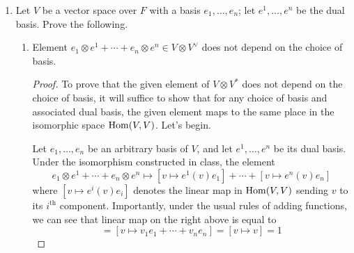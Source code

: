 \documentclass[../psets.tex]{subfiles}
\begin{document}
\begin{enumerate}
\begin{enumerate}
\begin{proof}
            As to the second part of the question, we have from Q4b --- and by mimicking its methods --- that
            \begin{align*}
                S^0(2,1) &= (3)\\
                S^1(2,1) &= (2,1)\\
                S^2(2,1) &= (2,1)\oplus(3)\\
                S^3(2,1) &= (2,1)\oplus(3)\oplus(1,1,1)\\
                S^4(2,1) &= (2,1)^2\oplus(3)\\
                S^5(2,1) &= (2,1)^2\oplus(3)\oplus(1,1,1)
            \end{align*}
            Therefore,
            \begin{equation*}
                \boxed{S^k(2,1) = S^{k\bmod 6}(2,1)\oplus R^{\lfloor k/6 \rfloor}}
            \end{equation*}
        \end{proof}
    \end{enumerate}
    \item Let $V$ be a vector space over $F$ with a basis $e_1,\dots,e_n$; let $e^1,\dots,e^n$ be the dual basis. Prove the following.
    \begin{enumerate}
        \item Element $e_1\otimes e^1+\cdots+e_n\otimes e^n\in V\otimes V^\vee$ does not depend on the choice of basis.
        \begin{proof}
            To prove that the given element of $V\otimes V^*$ does not depend on the choice of basis, it will suffice to show that for any choice of basis and associated dual basis, the given element maps to the same place in the isomorphic space $\operatorname{Hom}(V,V)$. Let's begin.\par
            Let $e_1,\dots,e_n$ be an arbitrary basis of $V$, and let $e^1,\dots,e^n$ be its dual basis. Under the isomorphism constructed in class, the element
            \begin{equation*}
                e_1\otimes e^1+\cdots+e_n\otimes e^n \mapsto [v\mapsto e^1(v)e_1]+\cdots+[v\mapsto e^n(v)e_n]
            \end{equation*}
            where $[v\mapsto e^i(v)e_i]$ denotes the linear map in $\operatorname{Hom}(V,V)$ sending $v$ to its $i^\text{th}$ component. Importantly, under the usual rules of adding functions, we can see that linear map on the right above is equal to
            \begin{equation*}
                [v\mapsto e^1(v)e_1+\cdots+e^n(v)e_n] = [v\mapsto v_1e_1+\cdots+v_ne_n] = [v\mapsto v] = 1

\end{equation*}
\end{proof}
\end{enumerate}
\end{enumerate}
\end{document}
